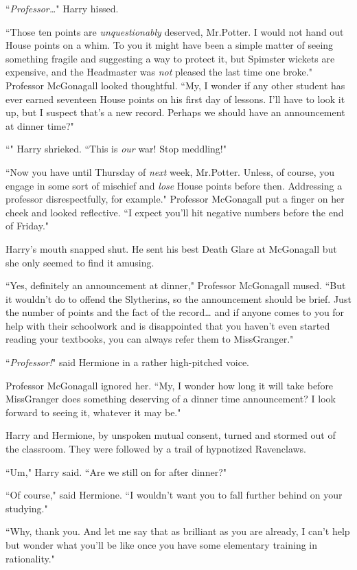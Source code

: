 ``\emph{Professor{\ldots}}" Harry hissed.

``Those ten points are \emph{unquestionably} deserved, Mr.\?Potter. I would not hand out House points on a whim. To you it might have been a simple matter of seeing something fragile and suggesting a way to protect it, but Spimster wickets are expensive, and the Headmaster was \emph{not} pleased the last time one broke." Professor McGonagall looked thoughtful. ``My, I wonder if any other student has ever earned seventeen House points on his first day of lessons. I'll have to look it up, but I suspect that's a new record. Perhaps we should have an announcement at dinner time?"

``" Harry shrieked. ``This is \emph{our} war! Stop meddling!"

``Now you have until Thursday of \emph{next} week, Mr.\?Potter. Unless, of course, you engage in some sort of mischief and \emph{lose} House points before then. Addressing a professor disrespectfully, for example." Professor McGonagall put a finger on her cheek and looked reflective. ``I expect you'll hit negative numbers before the end of Friday."

Harry's mouth snapped shut. He sent his best Death Glare at McGonagall but she only seemed to find it amusing.

``Yes, definitely an announcement at dinner," Professor McGonagall mused. ``But it wouldn't do to offend the Slytherins, so the announcement should be brief. Just the number of points and the fact of the record{\ldots} and if anyone comes to you for help with their schoolwork and is disappointed that you haven't even started reading your textbooks, you can always refer them to Miss\?Granger."

``\emph{Professor!}" said Hermione in a rather high-pitched voice.

Professor McGonagall ignored her. ``My, I wonder how long it will take before Miss\?Granger does something deserving of a dinner time announcement? I look forward to seeing it, whatever it may be."

Harry and Hermione, by unspoken mutual consent, turned and stormed out of the classroom. They were followed by a trail of hypnotized Ravenclaws.

``Um," Harry said. ``Are we still on for after dinner?"

``Of course," said Hermione. ``I wouldn't want you to fall further behind on your studying."

``Why, thank you. And let me say that as brilliant as you are already, I can't help but wonder what you'll be like once you have some elementary training in rationality."

